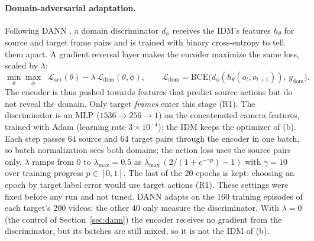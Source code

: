 \documentclass{article}
\begin{document}
\paragraph{Domain-adversarial adaptation.}
Following DANN \citep{ganin2016dann}, a domain discriminator $d_\phi$ receives the IDM's
features $h_\theta$ for source and target frame pairs and is trained with binary
cross-entropy to tell them apart. A gradient reversal layer makes the encoder maximize
the same loss, scaled by $\lambda$:
\begin{equation}
  \min_{\theta} \max_{\phi} \;\; \mathcal{L}_{\text{act}}(\theta) -
  \lambda \, \mathcal{L}_{\text{dom}}(\theta, \phi), \qquad
  \mathcal{L}_{\text{dom}} = \mathrm{BCE}\big(d_\phi(h_\theta(o_t, o_{t+1})),\, y_{\text{dom}}\big).
\end{equation}
The encoder is thus pushed towards features that predict source actions but do not
reveal the domain. Only target \emph{frames} enter this stage (R1). The discriminator is
an MLP ($1536 \rightarrow 256 \rightarrow 1$) on the concatenated camera features, trained
with Adam (learning rate $3 \times 10^{-4}$); the IDM keeps the optimizer of (b). Each step
passes 64 source and 64 target pairs through the encoder in one batch, so batch
normalization sees both domains; the action loss uses the source pairs only. $\lambda$
ramps from 0 to $\lambda_{\max} = 0.5$ as $\lambda_{\max}\,(2 / (1 + e^{-\gamma p}) - 1)$
with $\gamma = 10$ over training progress $p \in [0, 1]$. The last of the 20 epochs is
kept: choosing an epoch by target label error would use target actions (R1). These
settings were fixed before any run and not tuned. DANN adapts on the 160 training
episodes of each target's 200 videos; the other 40 only measure the discriminator. With
$\lambda = 0$ (the control of Section~\ref{sec:dann}) the encoder receives no gradient from
the discriminator, but its batches are still mixed, so it is not the IDM of (b).
\end{document}
